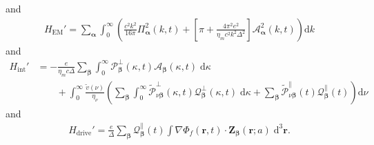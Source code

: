 \documentclass{article}
\begin{document}
and 
\begin{equation}
\begin{split}\label{eq:HEM2}
H_\mathrm{EM}' = \sum_{\bm{\alpha}}\int_0^\infty\left(\frac{c^2k^2}{16\pi}\mathit{\Pi}_{\bm{\alpha}}^2(k,t) + \left[\pi + \frac{4\pi^2e^2}{\eta_mc^2k^2\Delta^2}\right]\mathcal{A}_{\bm{\alpha}}^2(k,t)\right)\mathrm{d}k
\end{split}
\end{equation}
and
\begin{equation}
\begin{split}
H_\mathrm{int}' &= -\frac{e}{\eta_mc\Delta}\sum_{\bm{\beta}}\int_0^\infty\mathcal{P}_{\bm{\beta}}^\perp(\kappa,t)\mathcal{A}_{\bm{\beta}}(\kappa,t)\;\mathrm{d}\kappa\\
&\qquad + \int_0^\infty\frac{\tilde{v}(\nu)}{\eta_\nu}\left(\sum_{\bm{\beta}}\int_0^\infty\tilde{\mathcal{P}}_{\nu\bm{\beta}}^\perp(\kappa,t)\mathcal{Q}_{\bm{\beta}}^\perp(\kappa,t)\;\mathrm{d}\kappa + \sum_{\bm{\beta}}\tilde{\mathcal{P}}_{\nu\bm{\beta}}^\parallel(t)\mathcal{Q}_{\bm{\beta}}^\parallel(t)\right)\mathrm{d}\nu
\end{split}
\end{equation}
and
\begin{equation}
\begin{split}
H_\mathrm{drive}' = \frac{e}{\Delta}\sum_{\bm{\beta}}\mathcal{Q}_{\bm{\beta}}^\parallel(t)\int\nabla\Phi_f(\mathbf{r},t)\cdot\mathbf{Z}_{\bm{\beta}}(\mathbf{r};a)\;\mathrm{d}^3\mathbf{r}.
\end{split}
\end{equation}
\end{document}
